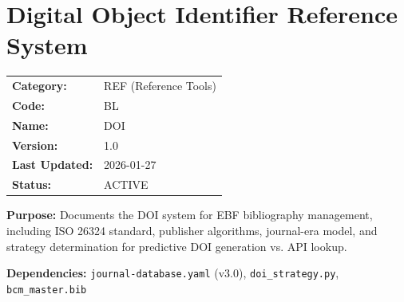 
\chapter{Digital Object Identifier Reference System}
\label{app:doi-reference}

\begin{tcolorbox}[colback=gray!5, colframe=gray!50, title=Appendix: BL REF-DOI]
\small
\begin{tabular}{ll}
\textbf{Category:} & REF (Reference Tools) \\
\textbf{Code:} & BL \\
\textbf{Name:} & DOI \\
\textbf{Version:} & 1.0 \\
\textbf{Last Updated:} & 2026-01-27 \\
\textbf{Status:} & ACTIVE \\
\end{tabular}

\vspace{0.5em}
\textbf{Purpose:} Documents the DOI system for EBF bibliography management, including ISO 26324 standard, publisher algorithms, journal-era model, and strategy determination for predictive DOI generation vs. API lookup.

\textbf{Dependencies:} \texttt{journal-database.yaml} (v3.0), \texttt{doi\_strategy.py}, \texttt{bcm\_master.bib}
\end{tcolorbox}

